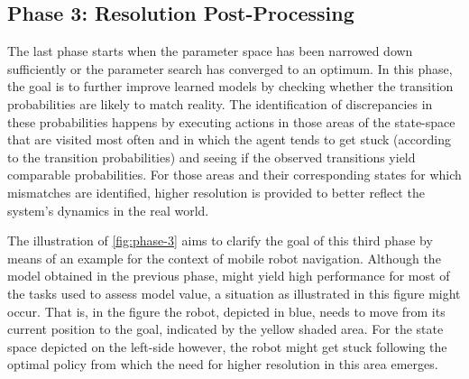 
\subsection{Phase 3: Resolution Post-Processing}
\label{sec:phase-3}

The last phase starts when the parameter space has been narrowed down sufficiently or the parameter search has converged to an optimum.
In this phase, the goal is to further improve learned models by checking whether the transition probabilities are likely to match reality.
The identification of discrepancies in these probabilities happens by executing actions in those areas of the state-space that are visited most often and in which the agent tends to get stuck (according to the transition probabilities) and seeing if the observed transitions yield comparable probabilities.
For those areas and their corresponding states for which mismatches are identified, higher resolution is provided to better reflect the system's dynamics in the real world.

The illustration of \autoref{fig:phase-3} aims to clarify the goal of this third phase by means of an example for the context of mobile robot navigation.
Although the model obtained in the previous phase, might yield high performance for most of the tasks used to assess model value, a situation as illustrated in this figure might occur.
That is, in the figure the robot, depicted in blue, needs to move from its current position to the goal, indicated by the yellow shaded area.
For the state space depicted on the left-side however, the robot might get stuck following the optimal policy from which the need for higher resolution in this area emerges.






